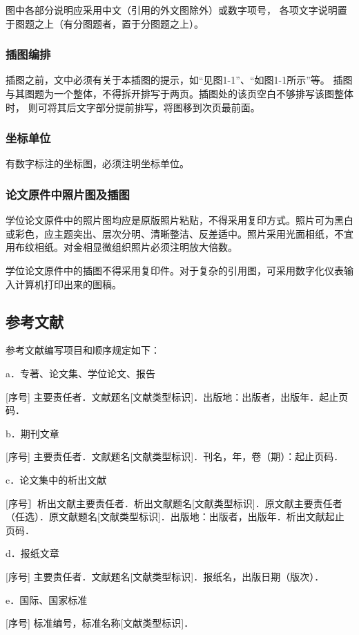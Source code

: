 图中各部分说明应采用中文（引用的外文图除外）或数字项号，
各项文字说明置于图题之上（有分图题者，置于分图题之上）。

\subsubsection{插图编排}
插图之前，文中必须有关于本插图的提示，如“见图1-1”、“如图1-1所示”等。
插图与其图题为一个整体，不得拆开排写于两页。插图处的该页空白不够排写该图整体时，
则可将其后文字部分提前排写，将图移到次页最前面。

\subsubsection{坐标单位}
有数字标注的坐标图，必须注明坐标单位。

\subsubsection{论文原件中照片图及插图}
学位论文原件中的照片图均应是原版照片粘贴，不得采用复印方式。照片可为黑白或彩色，应主题突出、层次分明、清晰整洁、反差适中。照片采用光面相纸，不宜用布纹相纸。对金相显微组织照片必须注明放大倍数。

学位论文原件中的插图不得采用复印件。对于复杂的引用图，可采用数字化仪表输入计算机打印出来的图稿。
 
\subsection{参考文献}

参考文献编写项目和顺序规定如下：

a．专著、论文集、学位论文、报告

[序号] 主要责任者．文献题名[文献类型标识]．出版地：出版者，出版年．起止页码．

b．期刊文章

[序号] 主要责任者．文献题名[文献类型标识]．刊名，年，卷（期）：起止页码．

c．论文集中的析出文献

[序号］析出文献主要责任者．析出文献题名[文献类型标识]．原文献主要责任者（任选）．原文献题名[文献类型标识]．出版地：出版者，出版年．析出文献起止页码．

d．报纸文章

[序号] 主要责任者．文献题名[文献类型标识]．报纸名，出版日期（版次）．

e．国际、国家标准

[序号] 标准编号，标准名称[文献类型标识]．


